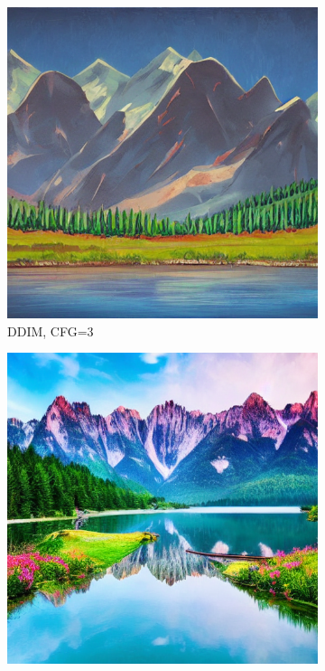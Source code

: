 \documentclass[10pt,twocolumn]{article}
\begin{document}
\begin{figure}[H]
    \centering
    \begin{subfigure}{0.32\textwidth}
        \includegraphics[width=\linewidth]{figures/baseline_ddim_cfg3.0_512_prompt1_20250712_092136.png}
        \caption{DDIM, CFG=3}
    \end{subfigure}
    \begin{subfigure}{0.32\textwidth}
        \includegraphics[width=\linewidth]{figures/baseline_ddim_cfg10.0_512_prompt1_20250712_092300.png}

\end{subfigure}
\end{figure}
\end{document}
